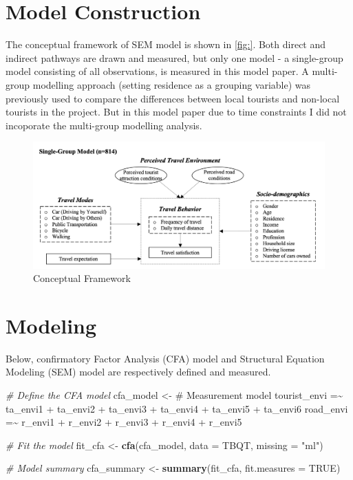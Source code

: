 \documentclass[
11pt, %
oneside, %
english, %
singlespacing, %
]{macthesis} %
\newenvironment{Shaded}{\begin{snugshade}}{\end{snugshade}}
\newcommand{\AttributeTok}[1]{\textcolor[rgb]{0.13,0.29,0.53}{#1}}
\newcommand{\CommentTok}[1]{\textcolor[rgb]{0.56,0.35,0.01}{\textit{#1}}}
\newcommand{\ConstantTok}[1]{\textcolor[rgb]{0.56,0.35,0.01}{#1}}
\newcommand{\FunctionTok}[1]{\textcolor[rgb]{0.13,0.29,0.53}{\textbf{#1}}}
\newcommand{\NormalTok}[1]{#1}
\newcommand{\OtherTok}[1]{\textcolor[rgb]{0.56,0.35,0.01}{#1}}
\newcommand{\StringTok}[1]{\textcolor[rgb]{0.31,0.60,0.02}{#1}}
\begin{document}
\section{Model Construction}\label{model-construction}

The conceptual framework of SEM model is shown in \ref{fig:}. Both direct and indirect pathways are drawn and measured, but only one model - a single-group model consisting of all observations, is measured in this model paper. A multi-group modelling approach (setting residence as a grouping variable) was previously used to compare the differences between local tourists and non-local tourists in the project. But in this model paper due to time constraints I did not incoporate the multi-group modelling analysis.

\begin{figure}
\includegraphics[width=0.8\linewidth]{figure/conceptual_framework} \caption{\label{fig:conceptual_framework} Conceptual Framework}\label{fig:fig2-conceptual-frmework}
\end{figure}

\section{Modeling}\label{modeling}

Below, confirmatory Factor Analysis (CFA) model and Structural Equation Modeling (SEM) model are respectively defined and measured.

\begin{Shaded}
\begin{Highlighting}[]
\CommentTok{\# Define the CFA model}
\NormalTok{cfa\_model }\OtherTok{\textless{}{-}} \StringTok{\textquotesingle{}}
\StringTok{\# Measurement model}
\StringTok{tourist\_envi =\textasciitilde{} ta\_envi1 + ta\_envi2 + ta\_envi3 + ta\_envi4 + ta\_envi5 + ta\_envi6}
\StringTok{road\_envi =\textasciitilde{} r\_envi1 + r\_envi2 + r\_envi3 + r\_envi4 + r\_envi5}
\StringTok{\textquotesingle{}}

\CommentTok{\# Fit the model}
\NormalTok{fit\_cfa }\OtherTok{\textless{}{-}} \FunctionTok{cfa}\NormalTok{(cfa\_model, }\AttributeTok{data =}\NormalTok{ TBQT, }\AttributeTok{missing =} \StringTok{"ml"}\NormalTok{)}

\CommentTok{\# Model summary}
\NormalTok{cfa\_summary }\OtherTok{\textless{}{-}} \FunctionTok{summary}\NormalTok{(fit\_cfa, }\AttributeTok{fit.measures =} \ConstantTok{TRUE}\NormalTok{)}
\end{Highlighting}
\end{Shaded}
\end{document}
